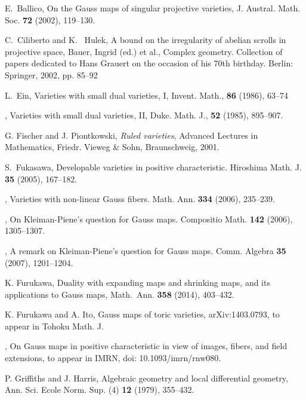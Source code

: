 \documentclass[a4paper,12pt]{amsart}
\theoremstyle{plain}
\theoremstyle{definition}
\begin{document}
\begin{thebibliography}{99}

 E.~Ballico,
  On the Gauss maps of singular projective varieties,
  J. Austral. Math. Soc. \textbf{72} (2002), 119--130.

 C.~Ciliberto and K.~ Hulek, A bound on the irregularity of abelian scrolls in projective space, Bauer, Ingrid (ed.) et al., Complex geometry. Collection of papers dedicated to Hans Grauert on the occasion of his 70th birthday. Berlin: Springer, 2002, pp. 85--92

  L.~Ein, Varieties with small dual varieties, I, Invent. Math., \textbf{86} (1986), 63--74

  \bysame, Varieties with small dual varieties, II, Duke. Math. J., \textbf{52} (1985), 895--907.

  G. Fischer and J. Piontkowski, \emph{Ruled varieties}, Advanced Lectures in Mathematics, Friedr. Vieweg
  \& Sohn, Braunschweig, 2001.

  
  
  

  

  S.~Fukasawa, Developable varieties in positive characteristic. Hiroshima Math. J. {\bf 35} (2005), 167--182.

  \bysame, Varieties with non-linear Gauss fibers. Math. Ann. {\bf 334} (2006), 235--239.

  \bysame, On Kleiman-Piene's question for Gauss maps. Compositio Math. {\bf 142} (2006), 1305--1307.

  \bysame, A remark on Kleiman-Piene's question for Gauss maps. Comm. Algebra {\bf 35} (2007), 1201--1204. 

  K. Furukawa, Duality with expanding maps and shrinking maps, and its applications to Gauss maps, Math.\ Ann. \textbf{358} (2014), 403--432.

 K. Furukawa and A. Ito, Gauss maps of toric varieties, arXiv:1403.0793, to appear in Tohoku Math. J.

 \bysame, On Gauss maps in positive characteristic in view of images, fibers, and field extensions,
  to appear in IMRN, doi: 10.1093/imrn/rnw080.

  P. Griffiths and J. Harris, Algebraic geometry and local differential geometry, Ann. Sci. Ecole Norm.
  Sup. (4) {\bf 12} (1979), 355--432.


\end{thebibliography}
\end{document}
